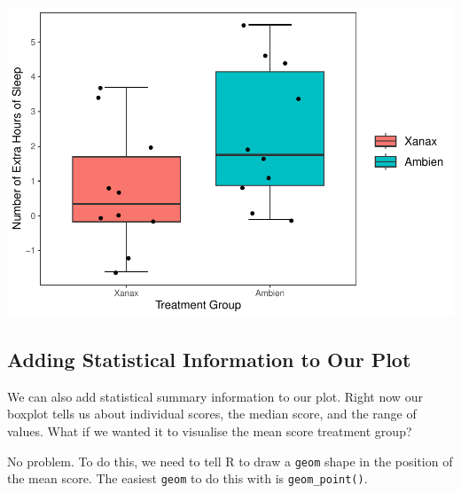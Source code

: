 \documentclass[
]{book}
\begin{document}
\includegraphics{rintro_demo_files/figure-latex/unnamed-chunk-302-1.pdf}

\hypertarget{adding-statistical-information-to-our-plot}{%
\subsection{Adding Statistical Information to Our Plot}\label{adding-statistical-information-to-our-plot}}

We can also add statistical summary information to our plot. Right now our boxplot tells us about individual scores, the median score, and the range of values. What if we wanted it to visualise the mean score treatment group?

No problem. To do this, we need to tell R to draw a \texttt{geom} shape in the position of the mean score. The easiest \texttt{geom} to do this with is \texttt{geom\_point()}.
\end{document}
